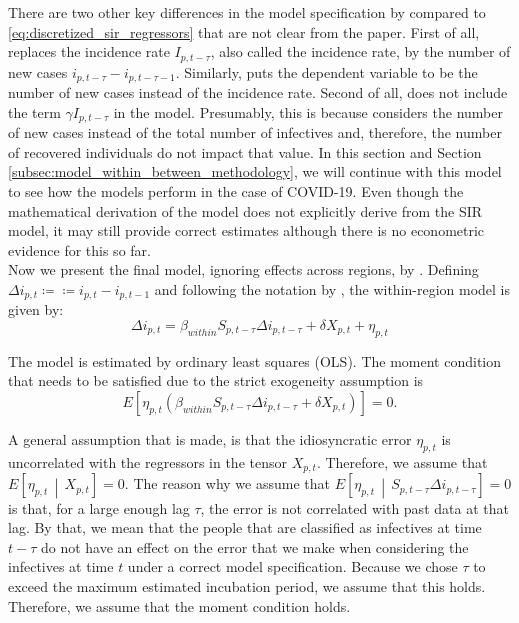 \documentclass[12pt]{article}
\begin{document}
	There are two other key differences in the model specification by \textcite{adda2016economic} compared to \eqref{eq:discretized_sir_regressors} that are not clear from the paper. First of all, \textcite{adda2016economic} replaces the incidence rate $I_{p,t-\tau}$, also called the incidence rate, by the number of new cases $i_{p,t-\tau} - i_{p,t-\tau-1}$. Similarly, \textcite{adda2016economic} puts the dependent variable to be the number of new cases instead of the incidence rate. Second of all, \textcite{adda2016economic} does not include the term $\gamma I_{p,t-\tau}$ in the model. Presumably, this is because \textcite{adda2016economic} considers the number of new cases instead of the total number of infectives and, therefore, the number of recovered individuals do not impact that value. In this section and Section \ref{subsec:model_within_between_methodology}, we will continue with this model to see how the models perform in the case of COVID-19. Even though the mathematical derivation of the model does not explicitly derive from the SIR model, it may still provide correct estimates although there is no econometric evidence for this so far. \\
	
	Now we present the final model, ignoring effects across regions, by \textcite{adda2016economic}. Defining $\Delta i_{p,t} \coloneqq  \coloneqq i_{p,t} - i_{p,t-1}$ and following the notation by \textcite{keeling2011modeling}, the within-region model is given by:
	\begin{equation} \label{eq:model_within}
	    \Delta i_{p,t} = \beta_{within}S_{p,t-\tau}\Delta i_{p,t-\tau} + \delta X_{p,t} + \eta_{p,t}
	\end{equation}
	
	The model is estimated by ordinary least squares (OLS). The moment condition that needs to be satisfied due to the strict exogeneity assumption is
	    \[E\left[ \eta_{p,t} \left( \beta_{within}S_{p,t-\tau}\Delta i_{p,t-\tau} + \delta X_{p,t} \right) \right] = 0.\]
	
	A general assumption that is made, is that the idiosyncratic error $\eta_{p,t}$ is uncorrelated with the regressors in the tensor $X_{p,t}$. Therefore, we assume that $E\left[\eta_{p,t} \,\middle|\, X_{p,t}\right] = 0$. The reason why we assume that $E\left[\eta_{p,t} \,\middle|\, S_{p,t-\tau}\Delta i_{p,t-\tau}\right] = 0$ is that, for a large enough lag $\tau$, the error is not correlated with past data at that lag. By that, we mean that the people that are classified as infectives at time $t-\tau$ do not have an effect on the error that we make when considering the infectives at time $t$ under a correct model specification. Because we chose $\tau$ to exceed the maximum estimated incubation period, we assume that this holds. Therefore, we assume that the moment condition holds. \\
	
\end{document}
